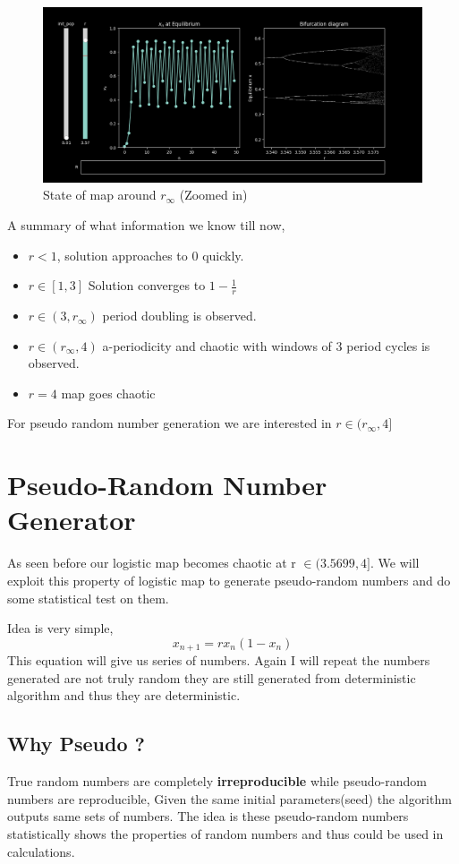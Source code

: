 \documentclass{report}
\begin{document}
\begin{figure}[!h]
    \centering
    \includegraphics[scale=.45]{images/rinfi.png}
    \caption{State of map around $r_{\infty}$ (Zoomed in)}
    \label{fig:my_label7}
\end{figure}

A summary of what information we know till now,

\begin{itemize}
  \item $r < 1$, solution approaches to 0 quickly.
  \item $r \in [1,3]$ Solution converges to $1-\frac{1}{r}$
  \item $r\in (3,r_{\infty})$ period doubling is observed.
  \item $r\in (r_{\infty},4)$ a-periodicity and chaotic with windows  of 3 period  cycles is observed.
  \item $r=4$ map goes chaotic
\end{itemize}
For pseudo random number generation we are interested in $r \in (r_{\infty},4]$
\newpage

\section{Pseudo-Random Number Generator}

As seen before our logistic map becomes chaotic at r $\in (3.5699,4]$. We will exploit this property of logistic map to generate pseudo-random numbers and do some statistical test on them.

Idea is very simple,
\begin{equation}
    x_{n+1} = rx_n(1-x_n) \nonumber
\end{equation}
This equation will give us series of numbers. Again I will repeat the numbers generated are not truly random they are still generated from deterministic algorithm and thus they are deterministic.
\subsection{Why Pseudo ?}
True random numbers are completely \textbf{irreproducible} while pseudo-random numbers are reproducible, Given the same initial parameters(seed) the algorithm outputs same sets of numbers. The idea is these pseudo-random numbers statistically shows the properties of random numbers and thus could be used in calculations.
\newline
\end{document}
